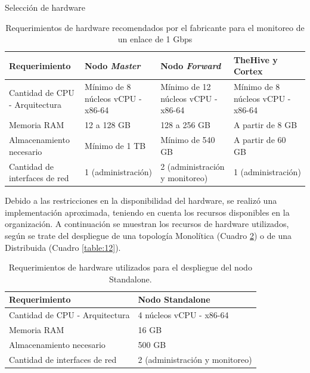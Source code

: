 \begin{subsection}{Selección de hardware}
    \begin{table}[H]
    \centering
    \begin{tabular}{|m{9em}|m{9em}|m{9em}|m{9em}|}
    \hline 
    Requerimiento  & Nodo \textit{Master} &  Nodo \textit{Forward} & TheHive y Cortex \\ 
    \hline
    Cantidad de CPU - Arquitectura & Mínimo de 8 núcleos vCPU - x86-64 & Mínimo de 12 núcleos vCPU - x86-64 & Mínimo de 8 núcleos vCPU - x86-64 \\ 
    \hline
    Memoria RAM  & 12 a 128 GB & 128 a 256 GB & A partir de 8 GB \\ 
    \hline
    Almacenamiento necesario & Mínimo de 1 TB  & Mínimo de 540 GB & A partir de 60 GB \\
    \hline
    Cantidad de interfaces de red & 1 (administración) & 2 (administración y monitoreo) & 1 (administración) \\
    \hline %
    \end{tabular}
    \caption{Requerimientos de hardware recomendados por el fabricante para el monitoreo de un enlace de 1 Gbps}
    \label{table:5}
    \end{table}
    Debido a las restricciones en la disponibilidad del hardware, se realizó una implementación aproximada, teniendo en cuenta los recursos disponibles en la organización. A continuación se muestran los recursos de hardware utilizados, según se trate del despliegue de una topología Monolítica (Cuadro \ref{table:16}) o de una Distribuida (Cuadro \ref{table:12}). \par
    \begin{table}[H]
    \centering
    \begin{tabular}{|m{10em}|m{10em}|}
    \hline 
    Requerimiento  & Nodo Standalone \\ 
    \hline
    Cantidad de CPU - Arquitectura &  4 núcleos vCPU - x86-64  \\ 
    \hline
    Memoria RAM  &  16 GB  \\ 
    \hline
    Almacenamiento necesario   & 500 GB  \\
    \hline
    Cantidad de interfaces de red  & 2 (administración y monitoreo) \\
    \hline %
    \end{tabular}
    \caption{Requerimientos de hardware utilizados para el despliegue del nodo Standalone.}
    \label{table:16}
   \end{table}

\end{subsection}
